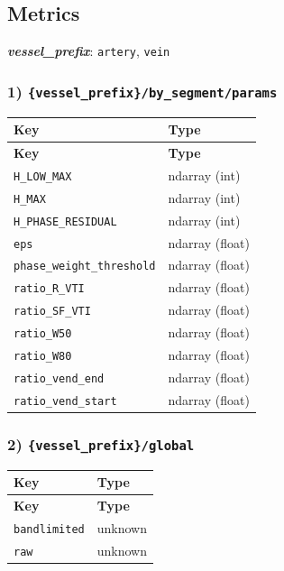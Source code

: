 \documentclass[11pt]{article}
\begin{document}
\subsection*{Metrics}
\textbf{\textit{vessel\_prefix}}: \texttt{artery}, \texttt{vein}
\subsubsection*{1) \texttt{\{vessel\_\allowbreak{}prefix\}/\allowbreak{}by\_\allowbreak{}segment/\allowbreak{}params}}
\begin{longtable}{|p{}|p{}|}
\hline
\textbf{Key} & \textbf{Type} \\ \hline
\endfirsthead
\hline
\textbf{Key} & \textbf{Type} \\ \hline
\endhead
\texttt{H\_\allowbreak{}LOW\_\allowbreak{}MAX} & ndarray (int) \\ \hline
\texttt{H\_\allowbreak{}MAX} & ndarray (int) \\ \hline
\texttt{H\_\allowbreak{}PHASE\_\allowbreak{}RESIDUAL} & ndarray (int) \\ \hline
\texttt{eps} & ndarray (float) \\ \hline
\texttt{phase\_\allowbreak{}weight\_\allowbreak{}threshold} & ndarray (float) \\ \hline
\texttt{ratio\_\allowbreak{}R\_\allowbreak{}VTI} & ndarray (float) \\ \hline
\texttt{ratio\_\allowbreak{}SF\_\allowbreak{}VTI} & ndarray (float) \\ \hline
\texttt{ratio\_\allowbreak{}W50} & ndarray (float) \\ \hline
\texttt{ratio\_\allowbreak{}W80} & ndarray (float) \\ \hline
\texttt{ratio\_\allowbreak{}vend\_\allowbreak{}end} & ndarray (float) \\ \hline
\texttt{ratio\_\allowbreak{}vend\_\allowbreak{}start} & ndarray (float) \\ \hline
\end{longtable}

\subsubsection*{2) \texttt{\{vessel\_\allowbreak{}prefix\}/\allowbreak{}global}}
\begin{longtable}{|p{}|p{}|}
\hline
\textbf{Key} & \textbf{Type} \\ \hline
\endfirsthead
\hline
\textbf{Key} & \textbf{Type} \\ \hline
\endhead
\texttt{bandlimited} & unknown \\ \hline
\texttt{raw} & unknown \\ \hline
\end{longtable}
\end{document}
